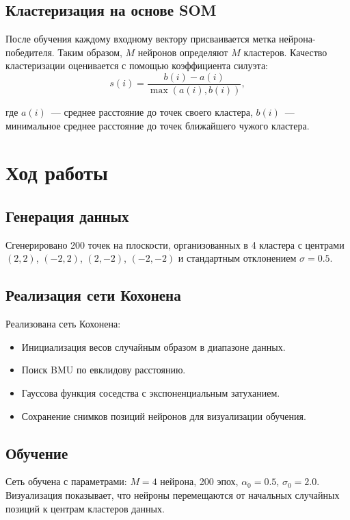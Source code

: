 \documentclass[14pt,a4paper]{extarticle}
\begin{document}
\subsection{Кластеризация на основе SOM}

После обучения каждому входному вектору присваивается метка нейрона-победителя. Таким образом, $M$ нейронов определяют $M$ кластеров. Качество кластеризации оценивается с помощью коэффициента силуэта:
\begin{equation}
s(i) = \frac{b(i) - a(i)}{\max(a(i), b(i))},
\end{equation}

где $a(i)$~--- среднее расстояние до точек своего кластера, $b(i)$~--- минимальное среднее расстояние до точек ближайшего чужого кластера.

\section{Ход работы}

\subsection{Генерация данных}

Сгенерировано 200 точек на плоскости, организованных в 4 кластера с центрами $(2, 2)$, $(-2, 2)$, $(2, -2)$, $(-2, -2)$ и стандартным отклонением $\sigma = 0.5$.

\subsection{Реализация сети Кохонена}

Реализована сеть Кохонена:
\begin{itemize}
\item Инициализация весов случайным образом в диапазоне данных.
\item Поиск BMU по евклидову расстоянию.
\item Гауссова функция соседства с экспоненциальным затуханием.
\item Сохранение снимков позиций нейронов для визуализации обучения.
\end{itemize}

\subsection{Обучение}

Сеть обучена с параметрами: $M = 4$ нейрона, 200 эпох, $\alpha_0 = 0.5$, $\sigma_0 = 2.0$. Визуализация показывает, что нейроны перемещаются от начальных случайных позиций к центрам кластеров данных.
\end{document}
